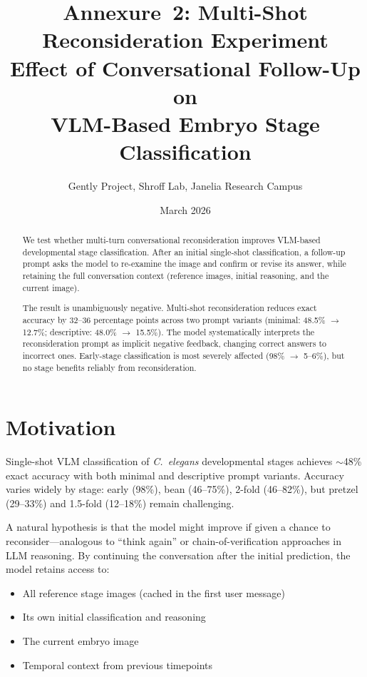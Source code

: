 \documentclass[11pt, a4paper]{article}
\title{%
  \sffamily\bfseries
  Annexure~2: Multi-Shot Reconsideration Experiment\\[4pt]
  \Large Effect of Conversational Follow-Up on\\
  VLM-Based Embryo Stage Classification
}
\author{%
  Gently Project, Shroff Lab, Janelia Research Campus
}
\date{March 2026}
\begin{document}
\maketitle

\begin{abstract}
We test whether multi-turn conversational reconsideration improves VLM-based
developmental stage classification.  After an initial single-shot classification,
a follow-up prompt asks the model to re-examine the image and confirm or revise
its answer, while retaining the full conversation context (reference images,
initial reasoning, and the current image).

The result is unambiguously negative.  Multi-shot reconsideration reduces exact
accuracy by 32--36 percentage points across two prompt variants (minimal: 48.5\%
$\to$ 12.7\%; descriptive: 48.0\% $\to$ 15.5\%).  The model systematically
interprets the reconsideration prompt as implicit negative feedback, changing
correct answers to incorrect ones.  Early-stage classification is most severely
affected (98\% $\to$ 5--6\%), but no stage benefits reliably from reconsideration.
\end{abstract}

\section{Motivation}

Single-shot VLM classification of \emph{C.~elegans} developmental stages
achieves $\sim$48\% exact accuracy with both minimal and descriptive prompt
variants.  Accuracy varies widely by stage: early (98\%), bean (46--75\%), 2-fold
(46--82\%), but pretzel (29--33\%) and 1.5-fold (12--18\%) remain challenging.

A natural hypothesis is that the model might improve if given a chance to
reconsider---analogous to ``think again'' or chain-of-verification approaches in
LLM reasoning.  By continuing the conversation after the initial prediction, the
model retains access to:

\begin{itemize}[nosep]
  \item All reference stage images (cached in the first user message)
  \item Its own initial classification and reasoning
  \item The current embryo image
  \item Temporal context from previous timepoints
\end{itemize}
\end{document}

